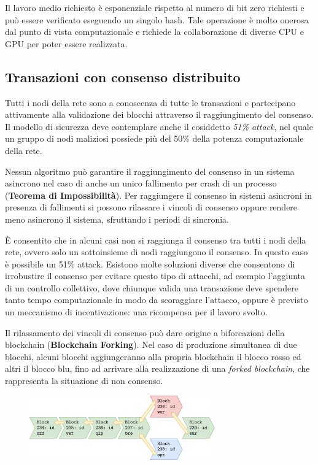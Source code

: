 Il lavoro medio richiesto è esponenziale rispetto al numero di bit zero richiesti e può essere verificato eseguendo un singolo hash. Tale operazione è molto onerosa dal punto di vista computazionale e richiede la collaborazione di diverse CPU e GPU per poter essere realizzata.

\subsection{Transazioni con consenso distribuito}
Tutti i nodi della rete sono a conoscenza di tutte le transazioni e partecipano attivamente alla validazione dei blocchi attraverso il raggiungimento del consenso. Il modello di sicurezza deve contemplare anche il cosiddetto \textit{51\% attack}, nel quale un gruppo di nodi maliziosi possiede più del 50\% della potenza computazionale della rete.

Nessun algoritmo può garantire il raggiungimento del consenso in un sistema asincrono nel caso di anche un unico fallimento per crash di un processo (\textbf{Teorema di Impossibilità}). Per raggiungere il consenso in sistemi asincroni in presenza di fallimenti si possono rilassare i vincoli di consenso oppure rendere meno asincrono il sistema, sfruttando i periodi di sincronia.

\vspace{5mm}

È consentito che in alcuni casi non si raggiunga il consenso tra tutti i nodi della rete, ovvero solo un sottoinsieme di nodi raggiungono il consenso. In questo caso è possibile un 51\% attack. Esistono molte soluzioni diverse che consentono di irrobustire il consenso per evitare questo tipo di attacchi, ad esempio l'aggiunta di un controllo collettivo, dove chiunque valida una transazione deve spendere tanto tempo computazionale in modo da scoraggiare l'attacco, oppure è previsto un meccanismo di incentivazione: una ricompensa per il lavoro svolto.

Il rilassamento dei vincoli di consenso può dare origine a biforcazioni della blockchain (\textbf{Blockchain Forking}). Nel caso di produzione simultanea di due blocchi, alcuni blocchi aggiungeranno alla propria blockchain il blocco rosso ed altri il blocco blu, fino ad arrivare alla realizzazione di una \textit{forked blockchain}, che rappresenta la situazione di non consenso.

\begin{figure}[hbt!]
    \centering
    \includegraphics[width=8cm]{./Images/cap3/3.6.png}
\end{figure}

